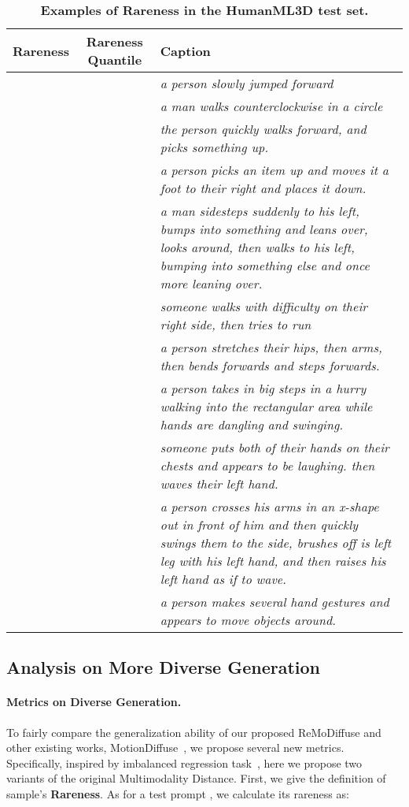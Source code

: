 \documentclass[10pt,twocolumn,letterpaper]{article}
\newcommand{\name}{ReMoDiffuse\xspace}
\begin{document}
\begin{table*}[h]
\centering
\caption{\textbf{Examples of Rareness in the HumanML3D test set.}}
\label{tab:example}
\renewcommand{\arraystretch}{1.4}
\setlength{\tabcolsep}{1.4mm}
{
\begin{tabular}{ccp{12cm}}
\hline

\textbf{Rareness} & \textbf{Rareness Quantile} & \textbf{Caption} \\
\hline
 &  & \textit{a person slowly jumped forward} \\ 
 &  & \textit{a man walks counterclockwise in a circle} \\
 &  & \textit{the person quickly walks forward, and picks something up.} \\
 &  & \textit{a person picks an item up and moves it a foot to their right and places it down.} \\
 &  & \textit{a man sidesteps suddenly to his left, bumps into something and leans over, looks around, then walks to his left, bumping into something else and once more leaning over.} \\
 &  & \textit{someone walks with difficulty on their right side, then tries to run} \\
 &  & \textit{a person stretches their hips, then arms, then bends forwards and steps forwards.} \\
 &  & \textit{a person takes in big steps in a hurry walking into the rectangular area while hands are dangling and swinging.} \\
 &  & \textit{someone puts both of their hands on their chests and appears to be laughing. then waves their left hand.} \\
 &  & \textit{a person crosses his arms in an x-shape out in front of him and then quickly swings them to the side, brushes off is left leg with his left hand, and then raises his left hand as if to wave.} \\
 &  & \textit{a person makes several hand gestures and appears to move objects around.} \\
\hline

\end{tabular}}
\end{table*}



\subsection{Analysis on More Diverse Generation}

\paragraph{Metrics on Diverse Generation.} To fairly compare the generalization ability of our proposed \name and other existing works, \eg MotionDiffuse~\cite{zhang2022motiondiffuse}, we propose several new metrics. Specifically, inspired by imbalanced regression task~\cite{ren2022balanced}, here we propose two variants of the original Multimodality Distance. First, we give the definition of sample's \textbf{Rareness}. As for a test prompt , we calculate its rareness  as:
\end{document}
